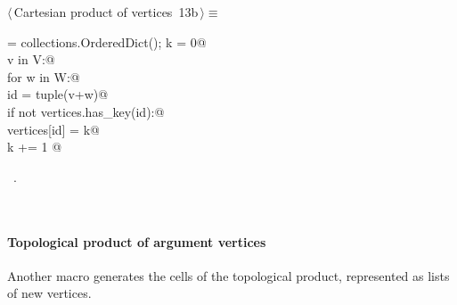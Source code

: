 \documentclass[11pt,oneside]{article}	%
\begin{document}
\begin{flushleft} \small
\begin{minipage}{\linewidth} \label{scrap19}
\protect{}$\langle\,$Cartesian product of vertices\nobreak\ {\footnotesize 13b}$\,\rangle\equiv$
\vspace{-1ex}
\begin{list}{}{} \item
\mbox{}\verb@vertices = collections.OrderedDict(); k = 0@\\
\mbox{}\verb@for v in V:@\\
\mbox{}\verb@    for w in W:@\\
\mbox{}\verb@        id = tuple(v+w)@\\
\mbox{}\verb@        if not vertices.has_key(id):@\\
\mbox{}\verb@            vertices[id] = k@\\
\mbox{}\verb@            k += 1   @{\NWsep}
\end{list}
\vspace{-1ex}
\footnotesize\addtolength{\baselineskip}{-1ex}
\begin{list}{}{\setlength{\itemsep}{-\parsep}\setlength{\itemindent}{-\leftmargin}}
\item \NWtxtMacroRefIn\ .
\end{list}
\end{minipage}\\[4ex]
\end{flushleft}


\paragraph{Topological product of argument vertices}
Another macro generates the cells of the topological product, represented as lists of new vertices. 
\end{document}

